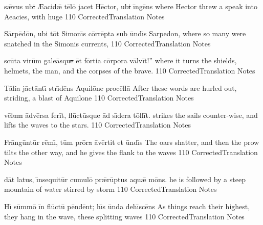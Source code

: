 \documentclass[]{book}
\begin{document}
	\latline
	  {s\={\ae}v\-us \-ub\sout{i }\={\AE}a\-c\-id\={\ae} t\={\macron e}l\={\macron o} j\-ac\-et H\=ect\-or, \-ub\sout{i }\=ing\={\macron e}ns}
	  { where Hector threw a speak into Aeacies, with huge }
	  {110}
	  { CorrectedTranslation }
	  { Notes }


	\latline
	  {S\=arp\={\macron e}d\={\macron o}n, \-ub\-i t\=ot S\-im\-on\={\macron \i}s c\=orr\=ept\-a s\-ub \=und\={\macron \i}s}
	  { Sarpedon, where so many were snatched in the Simonis currents,  }
	  {110}
	  { CorrectedTranslation }
	  { Notes }


	\newpage

	\latline
	  {sc\={\macron u}t\-a v\-ir\=um g\-al\-e\={\macron a}squ\sout{e }\=et f\=ort\-i\-a c\=orp\-or\-a v\=alv\=it!''}
	  { where it turns the shields, helmets, the man, and the corpses of the brave. }
	  {110}
	  { CorrectedTranslation }
	  { Notes }


	\latline
	  {T\={\macron a}l\-i\-a j\=act\=ant\={\macron \i} str\={\macron \i}d\={\macron e}ns \-Aqu\-il\={\macron o}n\-e pr\-oc\=ell\=a}
	  { After these words are hurled out, striding, a blast of Aquilone }
	  {110}
	  { CorrectedTranslation }
	  { Notes }


	\latline
	  {v\={\macron e}l\sout{um }\=adv\=ers\-a f\-er\=it, fl\={\macron u}ct\={\macron u}squ\sout{e }\=ad s\={\macron \i}d\-er\-a t\=oll\=it.}
	  { strikes the sails counter-wise, and lifts the waves to the stars. }
	  {110}
	  { CorrectedTranslation }
	  { Notes }


	\newpage

	\latline
	  {Fr\=ang\=unt\=ur r\={\macron e}m\={\macron \i}, t\=um pr\={\macron o}r\sout{a }\={\macron a}v\=ert\-it \-et \=und\={\macron \i}s}
	  { The oars shatter, and then the prow tilts the other way, and he gives the flank to the waves }
	  {110}
	  { CorrectedTranslation }
	  { Notes }


	\latline
	  {d\=at l\-at\-us, \={\macron \i}ns\-equ\-it\=ur c\-um\-ul\={\macron o} pr\={\ae}r\=upt\-us \-aqu\={\ae} m\={\macron o}ns.}
	  { he is followed by a steep mountain of water stirred by storm }
	  {110}
	  { CorrectedTranslation }
	  { Notes }


	\latline
	  {H\={\macron \i} s\=umm\={\macron o} \=in fl\={\macron u}ct\={\macron u} p\=end\=ent; h\={\macron \i}s \=und\-a d\-eh\={\macron \i}sc\={\macron e}ns}
	  { As things reach their highest, they hang in the wave, these splitting waves }
	  {110}
	  { CorrectedTranslation }
	  { Notes }


	\newpage
\end{document}
